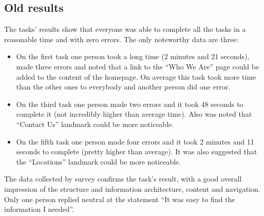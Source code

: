 \subsection{Old results}
The tasks' results show that everyone was able to complete all the tasks in a reasonable time and with zero errors. The only noteworthy data are three:
\begin{itemize}
\item On the first task one person took a long time (2 minutes and 21 seconds), made three errors and noted that a link to the ``Who We Are'' page could be added to the content of the homepage. On average this task took more time than the other ones to everybody and another person did one error.
\item On the third task one person made two errors and it took 48 seconds to complete it (not incredibly higher than average time). Also was noted that ``Contact Us'' landmark could be more noticeable.
\item On the fifth task one person made four errors and it took 2 minutes and 11 seconds to complete (pretty higher than average). It was also suggested that the ``Locations'' landmark could be more noticeable.
\end{itemize}
The data collected by survey confirms the task's result, with a good overall impression of the structure and information architecture, content and navigation. Only one person replied neutral at the statement ``It was easy to find the information I needed''.




